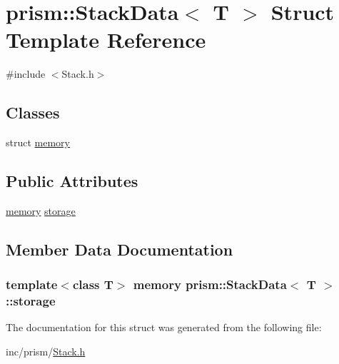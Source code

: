 \hypertarget{structprism_1_1_stack_data}{}\section{prism\+:\+:Stack\+Data$<$ T $>$ Struct Template Reference}
\label{structprism_1_1_stack_data}


{\ttfamily \#include $<$Stack.\+h$>$}

\subsection*{Classes}
\begin{DoxyCompactItemize}
\item 
struct \hyperlink{structprism_1_1_stack_data_1_1memory}{memory}
\end{DoxyCompactItemize}
\subsection*{Public Attributes}
\begin{DoxyCompactItemize}
\item 
\hyperlink{structprism_1_1_stack_data_1_1memory}{memory} \hyperlink{structprism_1_1_stack_data_a0741dd95964c79dc8969d24e2b082bca}{storage}
\end{DoxyCompactItemize}


\subsection{Member Data Documentation}
\subsubsection[{\texorpdfstring{storage}{storage}}]{\setlength{\rightskip}{0pt plus 5cm}template$<$class T$>$ {\bf memory} {\bf prism\+::\+Stack\+Data}$<$ T $>$\+::storage}\hypertarget{structprism_1_1_stack_data_a0741dd95964c79dc8969d24e2b082bca}{}\label{structprism_1_1_stack_data_a0741dd95964c79dc8969d24e2b082bca}


The documentation for this struct was generated from the following file\+:\begin{DoxyCompactItemize}
\item 
inc/prism/\hyperlink{_stack_8h}{Stack.\+h}\end{DoxyCompactItemize}
